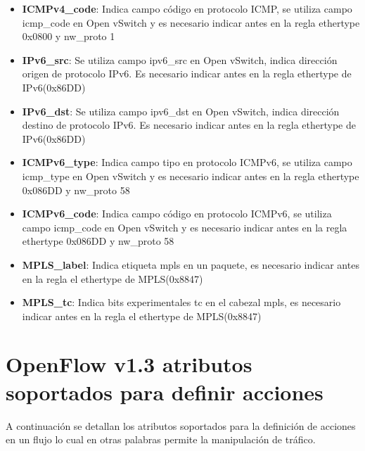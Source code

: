 \begin{itemize}
\item \textbf{ICMPv4\_code}: Indica campo código en protocolo ICMP, se utiliza campo icmp\_code en Open vSwitch y es necesario indicar antes en la regla ethertype 0x0800 y nw\_proto 1

\item \textbf{IPv6\_src}: Se utiliza campo ipv6\_src en Open vSwitch, indica direcci\'on origen de protocolo IPv6. Es necesario indicar antes en la regla ethertype de IPv6(0x86DD)

\item \textbf{IPv6\_dst}: Se utiliza campo ipv6\_dst en Open vSwitch, indica direcci\'on destino de protocolo IPv6. Es necesario indicar antes en la regla ethertype de IPv6(0x86DD)

\item \textbf{ICMPv6\_type}: Indica campo tipo en protocolo ICMPv6, se utiliza campo icmp\_type en Open vSwitch y es necesario indicar antes en la regla ethertype 0x086DD y nw\_proto 58

\item \textbf{ICMPv6\_code}: Indica campo código en protocolo ICMPv6, se utiliza campo icmp\_code en Open vSwitch y es necesario indicar antes en la regla ethertype 0x086DD y nw\_proto 58

\item \textbf{MPLS\_label}: Indica etiqueta mpls en un paquete, es necesario indicar antes en la regla el ethertype de MPLS(0x8847) 

\item \textbf{MPLS\_tc}: Indica bits experimentales tc en el cabezal mpls, es necesario indicar antes en la regla el ethertype de MPLS(0x8847)

\end{itemize}

\section{OpenFlow v1.3 atributos soportados para definir acciones}
A continuaci\'on se detallan los atributos soportados para la definici\'on de acciones en un flujo lo cual en otras palabras permite la manipulaci\'on de tr\'afico.

